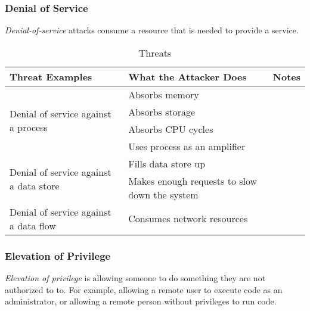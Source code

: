 \subsubsection{Denial of Service}\label{subsubsec:Denial_of_Service}
\begin{definition}\label{def:Denial_of_Service}
  \emph{Denial-of-service} attacks consume a resource that is needed to provide a service.
\end{definition}

\begin{table}[h!]
  \centering
  \begin{tabular}{p{5.7cm}p{5.7cm}p{5.7cm}}
    \toprule
    Threat Examples & What the Attacker Does & Notes \\
    \midrule
    \multirow{4}{5.7cm}{Denial of service against a process} & Absorbs memory & \\ \cline{2-3}
                    & Absorbs storage & \\ \cline{2-3}
                    & Absorbs CPU cycles & \\ \cline{2-3}
                    & Uses process as an amplifier & \\
    \midrule
    \multirow{2}{5.7cm}{Denial of service against a data store} & Fills data store up & \\ \cline{2-3}
                    & Makes enough requests to slow down the system & \\
    \midrule
    \multirow{1}{5.7cm}{Denial of service against a data flow} & Consumes network resources & \\
    \bottomrule
  \end{tabular}
  \caption{ Threats}
  \label{tab:Denial_of_Service_Threats}
\end{table}

\subsubsection{Elevation of Privilege}\label{subsubsec:Elevation_of_Privilege}
\begin{definition}\label{def:Elevation_of_Privilege}
  \emph{Elevation of privilege} is allowing someone to do something they are not authorized to to.
  For example, allowing a remote user to execute code as an administrator, or allowing a remote person without privileges to run code.
\end{definition}

